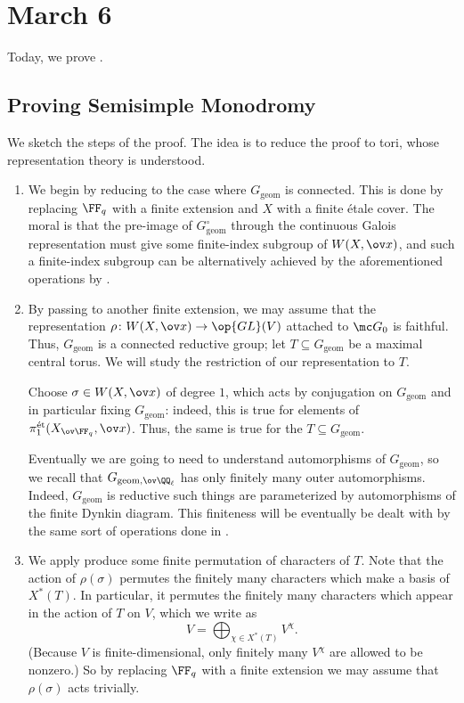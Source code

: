 \documentclass[../notes.tex]{subfiles}
\begin{document}
\section{March 6}
Today, we prove .

\subsection{Proving Semisimple Monodromy}
We sketch the steps of the proof. The idea is to reduce the proof to tori, whose representation theory is understood.
\begin{enumerate}
	\item We begin by reducing to the case where $G_{\mathrm{geom}}$ is connected. This is done by replacing $\FF_q$ with a finite extension and $X$ with a finite \'etale cover. The moral is that the pre-image of $G_{\mathrm{geom}}^\circ$ through the continuous Galois representation must give some finite-index subgroup of $W(X,\ov x)$, and such a finite-index subgroup can be alternatively achieved by the aforementioned operations by .

	\item By passing to another finite extension, we may assume that the representation $\rho\colon W(X,\ov x)\to\op{GL}(V)$ attached to $\mc G_0$ is faithful. Thus, $G_{\mathrm{geom}}$ is a connected reductive group; let $T\subseteq G_{\mathrm{geom}}$ be a maximal central torus. We will study the restriction of our representation to $T$.

	Choose $\sigma\in W(X,\ov x)$ of degree $1$, which acts by conjugation on $G_{\mathrm{geom}}$ and in particular fixing $G_{\mathrm{geom}}$: indeed, this is true for elements of $\pi_1^{\mathrm{\acute et}}(X_{\ov\FF_q},\ov x)$. Thus, the same is true for the $T\subseteq G_{\mathrm{geom}}$.

	Eventually we are going to need to understand automorphisms of $G_{\mathrm{geom}}$, so we recall that $G_{\mathrm{geom},\ov\QQ_\ell}$ has only finitely many outer automorphisms. Indeed, $G_{\mathrm{geom}}$ is reductive such things are parameterized by automorphisms of the finite Dynkin diagram. This finiteness will be eventually be dealt with by the same sort of operations done in .

	\item We apply produce some finite permutation of characters of $T$. Note that the action of $\rho(\sigma)$ permutes the finitely many characters which make a basis of $X^*(T)$. In particular, it permutes the finitely many characters which appear in the action of $T$ on $V$, which we write as
	\[V=\bigoplus_{\chi\in X^*(T)}V^\chi.\]
	(Because $V$ is finite-dimensional, only finitely many $V^\chi$ are allowed to be nonzero.) So by replacing $\FF_q$ with a finite extension we may assume that $\rho(\sigma)$ acts trivially.


\end{enumerate}
\end{document}

